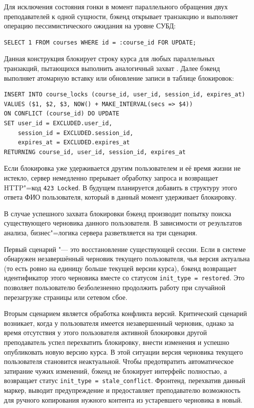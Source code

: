 \documentclass[coursework]{SCWorks}
\begin{document}
Для исключения состояния гонки в момент параллельного обращения двух преподавателей к одной сущности, бэкенд открывает транзакцию и выполняет операцию пессимистического ожидания на уровне СУБД:

\begin{verbatim}
SELECT 1 FROM courses WHERE id = :course_id FOR UPDATE;
\end{verbatim}

Данная конструкция блокирует строку курса для любых параллельных транзакций, пытающихся выполнить аналогичный захват \cite{postgres_concurrency}. Далее бэкенд выполняет атомарную вставку или обновление записи в таблице блокировок:

\begin{verbatim}
INSERT INTO course_locks (course_id, user_id, session_id, expires_at)
VALUES ($1, $2, $3, NOW() + MAKE_INTERVAL(secs => $4))
ON CONFLICT (course_id) DO UPDATE
SET user_id = EXCLUDED.user_id, 
    session_id = EXCLUDED.session_id, 
    expires_at = EXCLUDED.expires_at
RETURNING course_id, user_id, session_id, expires_at
\end{verbatim}

Если блокировка уже удерживается другим пользователем и её время жизни не истекло, сервер немедленно прерывает обработку запроса и возвращает HTTP"=код \texttt{423 Locked}. В будущем планируется добавить в структуру этого ответа ФИО пользователя, который в данный момент удерживает блокировку.

В случае успешного захвата блокировки бэкенд производит попытку поиска существующего черновика данного пользователя. В зависимости от результатов анализа, бизнес"=логика сервера разветвляется на три сценария.

Первый сценарий "--- это восстановление существующей сессии. Если в системе обнаружен незавершённый черновик текущего пользователя, чья версия актуальна (то есть ровно на единицу больше текущей версии курса), бэкенд возвращает идентификатор этого черновика вместе со статусом \texttt{init\_type = restored}. Это позволяет пользователю безболезненно продолжить работу при случайной перезагрузке страницы или сетевом сбое.

Вторым сценарием является обработка конфликта версий. Критический сценарий возникает, когда у пользователя имеется незавершенный черновик, однако за время отсутствия у этого пользователя активной блокировки другой преподаватель успел перехватить блокировку, внести изменения и успешно опубликовать новую версию курса. В этой ситуации версия черновика текущего пользователя становится неактуальной. Чтобы предотвратить автоматическое затирание чужих изменений, бэкенд не блокирует интерфейс полностью, а возвращает статус \texttt{init\_type = stale\_conflict}. Фронтенд, перехватив данный маркер, выводит предупреждение и предоставляет преподавателю возможность для ручного копирования нужного контента из устаревшего черновика в новый.
\end{document}
